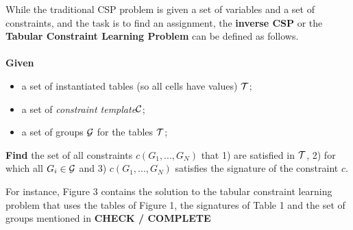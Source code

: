 \documentclass{ecai}
\newcommand{\sergey}[1]{\textcolor{magenta}{{\sc Sergey:} #1}\xspace}
\newcommand{\samuel}[1]{\textcolor{green}{{\sc Samuel:} #1}\xspace}
\newcommand{\format}[1]{\textit{#1}\xspace}
\newcommand{\template}{\format{constraint template}}
\newcommand{\CSignature}{Signature\xspace}
\newcommand{\CFunction}{Definition\xspace}
\newcommand{\groups}{\ensuremath{\mathcal{G}}\xspace}
\newcommand{\luc}[1]{{\textcolor{red}{#1}}}
\begin{document}
While the traditional CSP problem is given a set of variables and a set of constraints,
and the task is to find an assignment, the {\bf inverse CSP} or the {\bf Tabular Constraint Learning Problem} can be defined as follows.\\
\\
{\bf Given }
\begin{itemize}
\item
a set of instantiated tables (so all cells have values) ${\cal T}$;
\item
a set of \template ${\cal C}$;
\item
a set of groups ${\cal G}$ for the tables ${\cal T}$;
\end{itemize}
\noindent
{\bf Find}  the set of all constraints $c(G_1, ... , G_N)$ that 1) are satisfied  in ${\cal T}$, 2)
for which all $G_i \in {\cal G}$ and  3)  $c(G_1, ... , G_N)$ satisfies the signature of the constraint $c$.

For instance, Figure 3 contains the solution to the tabular constraint learning problem
that uses the tables of Figure 1, the signatures of Table 1 and the set of groups mentioned in {\bf CHECK / COMPLETE}






\end{document}
